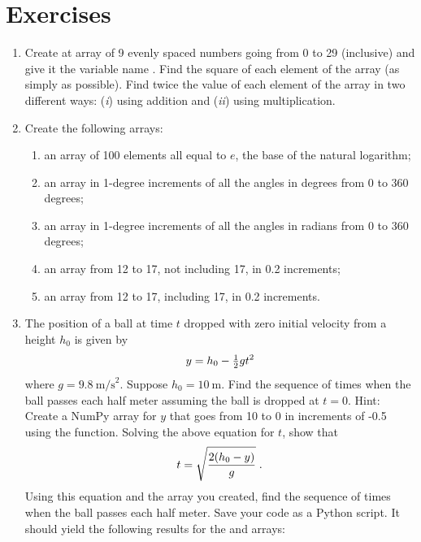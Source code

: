 \documentclass[letterpaper,10pt,english]{sphinxmanual}
\begin{document}
\section{Exercises}
\label{chap3/chap3_arrays:exercises}\begin{enumerate}
\item {} 
Create at array of 9 evenly spaced numbers going from 0 to 29 (inclusive) and give it the variable name .  Find the square of each element of the array (as simply as possible).  Find twice the value of each element of the array in two different ways: (\emph{i}) using addition and (\emph{ii}) using multiplication.

\item {} 
Create the following arrays:
\begin{enumerate}
\item {} 
an array of 100 elements all equal to $e$, the base of the natural logarithm;

\item {} 
an array in 1-degree increments of all the angles in degrees from 0 to 360 degrees;

\item {} 
an array in 1-degree increments of all the angles in radians from 0 to 360 degrees;

\item {} 
an array from 12 to 17, not including 17, in 0.2 increments;

\item {} 
an array from 12 to 17, including 17, in 0.2 increments.

\end{enumerate}

\item {} 
The position of a ball at time $t$ dropped with zero initial velocity from a height $h_0$ is given by
\begin{gather}
\begin{split}y = h_0 - \tfrac{1}{2}gt^2\end{split}\notag
\end{gather}
where $g=9.8~\mathrm{m/s}^2$.  Suppose $h_0=10~\mathrm{m}$.  Find the sequence of times when the ball passes each half meter assuming the ball is dropped at $t=0$.  Hint: Create a NumPy array for $y$ that goes from 10 to 0 in increments of -0.5 using the  function.  Solving the above equation for $t$, show that
\begin{gather}
\begin{split}t = \sqrt{\frac{2(h_0-y)}{g}} \;.\end{split}\notag
\end{gather}
Using this equation and the array you created, find the sequence of times when the ball passes each half meter.  Save your code as a Python script.  It should yield the following results for the  and  arrays:


\end{enumerate}
\end{document}

